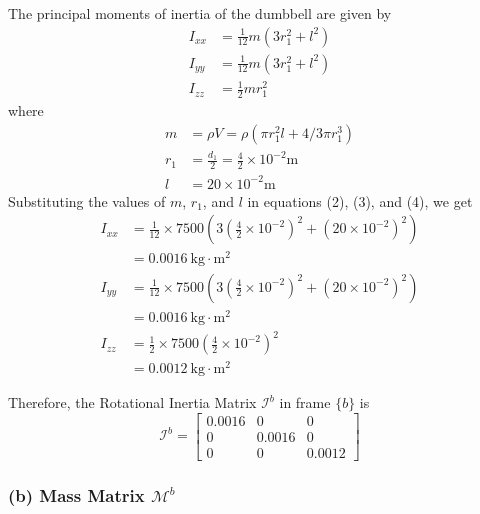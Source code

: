 The principal moments of inertia of the dumbbell are given by
\begin{align}
    I_{xx} & =\frac{1}{12} m\left(3 r_{1}^{2}+l^{2}\right) \\
    I_{yy} & =\frac{1}{12} m\left(3 r_{1}^{2}+l^{2}\right) \\
    I_{zz} & =\frac{1}{2} m r_{1}^{2}
\end{align}
where
\begin{align*}
    m     & =\rho V=\rho\left(\pi r_{1}^{2} l+4 / 3 \pi r_{1}^{3}\right) \\
    r_{1} & =\frac{d_{1}}{2}=\frac{4}{2} \times 10^{-2} \mathrm{m}       \\
    l     & =20 \times 10^{-2} \mathrm{m}
\end{align*}
Substituting the values of \( m \), \( r_{1} \), and \( l \) in equations (2), (3), and (4), we get
\begin{align*}
    I_{xx} & =\frac{1}{12} \times 7500\left(3\left(\frac{4}{2} \times 10^{-2}\right)^{2}+\left(20 \times 10^{-2}\right)^{2}\right) \\
           & =0.0016 \mathrm{~kg} \cdot \mathrm{m}^{2}                                                                             \\
    I_{yy} & =\frac{1}{12} \times 7500\left(3\left(\frac{4}{2} \times 10^{-2}\right)^{2}+\left(20 \times 10^{-2}\right)^{2}\right) \\
           & =0.0016 \mathrm{~kg} \cdot \mathrm{m}^{2}                                                                             \\
    I_{zz} & =\frac{1}{2} \times 7500\left(\frac{4}{2} \times 10^{-2}\right)^{2}                                                   \\
           & =0.0012 \mathrm{~kg} \cdot \mathrm{m}^{2}
\end{align*}

Therefore, the Rotational Inertia Matrix \( \mathcal{I}^{b} \) in frame \( \{b\} \) is
\begin{equation}
    \mathcal{I}^{b}=\begin{bmatrix}
        0.0016 & 0      & 0      \\
        0      & 0.0016 & 0      \\
        0      & 0      & 0.0012
    \end{bmatrix}
\end{equation}

\subsubsection*{(b) Mass Matrix \( \mathcal{M}^{b} \)}

